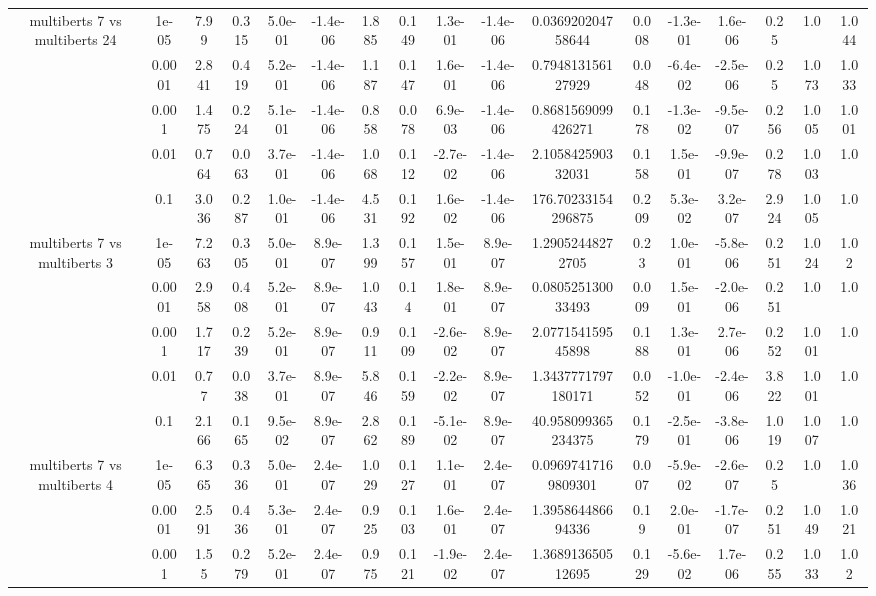 \begin{tabular}{|c|c|c|c|c|c|c|c|c|c|c|c|c|c|c|c|c|}
\hline
\multirow{5}{*}{multiberts 7 vs multiberts 24} & 1e-05 & 7.99 & 0.315 & 5.0e-01 & -1.4e-06 & 1.885 & 0.149 & 1.3e-01 & -1.4e-06 & 0.036920204758644 & 0.008 & -1.3e-01 & 1.6e-06 & 0.25 & 1.0 & 1.044 \\
 & 0.0001 & 2.841 & 0.419 & 5.2e-01 & -1.4e-06 & 1.187 & 0.147 & 1.6e-01 & -1.4e-06 & 0.794813156127929 & 0.048 & -6.4e-02 & -2.5e-06 & 0.25 & 1.073 & 1.033 \\
 & 0.001 & 1.475 & 0.224 & 5.1e-01 & -1.4e-06 & 0.858 & 0.078 & 6.9e-03 & -1.4e-06 & 0.8681569099426271 & 0.178 & -1.3e-02 & -9.5e-07 & 0.256 & 1.005 & 1.001 \\
 & 0.01 & 0.764 & 0.063 & 3.7e-01 & -1.4e-06 & 1.068 & 0.112 & -2.7e-02 & -1.4e-06 & 2.105842590332031 & 0.158 & 1.5e-01 & -9.9e-07 & 0.278 & 1.003 & 1.0 \\
 & 0.1 & 3.036 & 0.287 & 1.0e-01 & -1.4e-06 & 4.531 & 0.192 & 1.6e-02 & -1.4e-06 & 176.70233154296875 & 0.209 & 5.3e-02 & 3.2e-07 & 2.924 & 1.005 & 1.0 \\
\hline
\multirow{5}{*}{multiberts 7 vs multiberts 3} & 1e-05 & 7.263 & 0.305 & 5.0e-01 & 8.9e-07 & 1.399 & 0.157 & 1.5e-01 & 8.9e-07 & 1.29052448272705 & 0.23 & 1.0e-01 & -5.8e-06 & 0.251 & 1.024 & 1.02 \\
 & 0.0001 & 2.958 & 0.408 & 5.2e-01 & 8.9e-07 & 1.043 & 0.14 & 1.8e-01 & 8.9e-07 & 0.080525130033493 & 0.009 & 1.5e-01 & -2.0e-06 & 0.251 & 1.0 & 1.0 \\
 & 0.001 & 1.717 & 0.239 & 5.2e-01 & 8.9e-07 & 0.911 & 0.109 & -2.6e-02 & 8.9e-07 & 2.077154159545898 & 0.188 & 1.3e-01 & 2.7e-06 & 0.252 & 1.001 & 1.0 \\
 & 0.01 & 0.77 & 0.038 & 3.7e-01 & 8.9e-07 & 5.846 & 0.159 & -2.2e-02 & 8.9e-07 & 1.3437771797180171 & 0.052 & -1.0e-01 & -2.4e-06 & 3.822 & 1.001 & 1.0 \\
 & 0.1 & 2.166 & 0.165 & 9.5e-02 & 8.9e-07 & 2.862 & 0.189 & -5.1e-02 & 8.9e-07 & 40.958099365234375 & 0.179 & -2.5e-01 & -3.8e-06 & 1.019 & 1.007 & 1.0 \\
\hline
\multirow{5}{*}{multiberts 7 vs multiberts 4} & 1e-05 & 6.365 & 0.336 & 5.0e-01 & 2.4e-07 & 1.029 & 0.127 & 1.1e-01 & 2.4e-07 & 0.09697417169809301 & 0.007 & -5.9e-02 & -2.6e-07 & 0.25 & 1.0 & 1.036 \\
 & 0.0001 & 2.591 & 0.436 & 5.3e-01 & 2.4e-07 & 0.925 & 0.103 & 1.6e-01 & 2.4e-07 & 1.395864486694336 & 0.19 & 2.0e-01 & -1.7e-07 & 0.251 & 1.049 & 1.021 \\
 & 0.001 & 1.55 & 0.279 & 5.2e-01 & 2.4e-07 & 0.975 & 0.121 & -1.9e-02 & 2.4e-07 & 1.368913650512695 & 0.129 & -5.6e-02 & 1.7e-06 & 0.255 & 1.033 & 1.02 \\

\end{tabular}
